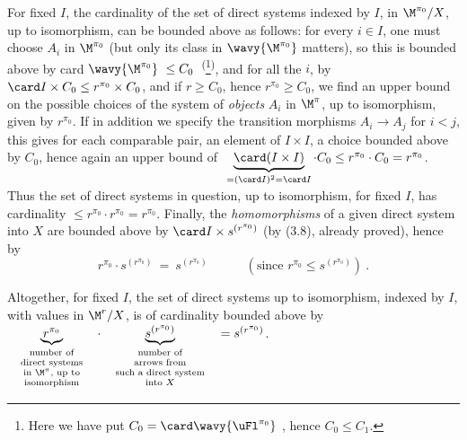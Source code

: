 For fixed $I$, the cardinality of the set of direct systems indexed by $I$, in $\M^{\pi_0}/X$, up to isomorphism, can be bounded above as follows: for every $i\in I$, one must choose $A_i$ in $\M^{\pi_0}$ (but only its class in $\wavy{\M^{\pi_0}}$ matters), so this is bounded above by card $\wavy{\M^{\pi_0}}\ \leq C_0$~\textsuperscript{(}\footnote[7]{Here we have put $C_0=\card\wavy{\uFl^{\pi_0}}$ , hence $C_0\leq C_1$.}\textsuperscript{)}, and for all the $i$, by $\card I\times C_0\leq r^{\pi_0}\times C_0$, and if $r\geq C_0$, hence $r^{\pi_0}\geq C_0$, we find an upper bound on the possible choices of the system of \textit{objects} $A_i$ in $\M^\pi$, up to isomorphism, given by $r^{\pi_0}$. If in addition we specify the transition morphisms $A_i\longrightarrow A_j$ for $i<j$, this gives for each comparable pair, an element of $I\times I$, a choice bounded above by $C_0$, hence again an upper bound of $\ \underbrace{\card(I\times I)}_{=(\card I)^2=\card I}\cdot C_0\leq r^{\pi_0}\cdot C_0=r^{\pi_0}$. Thus the set of direct systems in question, up to isomorphism, for fixed $I$, has cardinality $\leq r^{\pi_0}\cdot r^{\pi_0}=r^{\pi_0}$. Finally, the \textit{homomorphisms} of a given direct system into $X$ are bounded above by $\card I\times s^{(r^{\pi_0})}$ (by (3.8), already proved), hence by
\[
r^{\pi_0}\cdot s^{(r^{\pi_0})}\ =\ s^{(r^{\pi_0})}\qquad\quad(\text{since } r^{\pi_0}\leq s^{(r^{\pi_0})})\ .
\]

Altogether, for fixed $I$, the set of direct systems up to isomorphism, indexed by $I$, with values in $\M^r/X$, is  of cardinality bounded above by $\quad\underbrace{r^{\pi_0}}_{\text{\scriptsize\begin{tabular}{@{}c@{}}number of\\ direct systems\\ in $\M^\pi$, up to\\ isomorphism\end{tabular}}}\quad\cdot\quad\underbrace{s^{(r^{\pi_0})}}_{\text{\scriptsize\begin{tabular}{@{}c@{}}number of\\ arrows from\\ such a direct system\\ into $X$\end{tabular}}}\quad=s^{(r^{\pi_0})}$.

